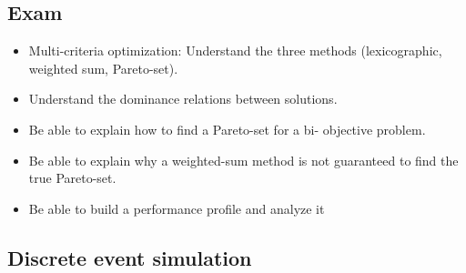 \subsection{Exam}
\begin{itemize}
    \item Multi-criteria optimization: Understand the three
        methods (lexicographic, weighted sum, Pareto-set).
    \item  Understand the dominance relations between
        solutions.
    \item  Be able to explain how to find a Pareto-set for a bi-
        objective problem.
    \item  Be able to explain why a weighted-sum method is not
        guaranteed to find the true Pareto-set.
    \item  Be able to build a performance profile and analyze it
\end{itemize}


\subsection{Discrete event simulation}


